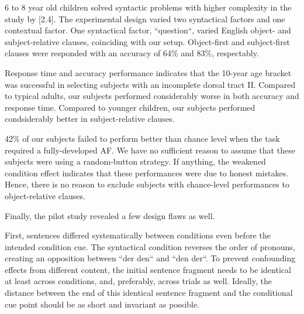 6 to 8 year old children solved syntactic problems with higher complexity in the study by [2.4].
The experimental design varied two syntactical factors and one contextual factor.
One syntactical factor, ``question``, varied English object- and subject-relative clauses, coinciding with our setup.
Object-first and subject-first clauses were responded with an accuracy of 64\% and 83\%, respectably.

Response time and accuracy performance indicates that the 10-year age bracket was successful in selecting subjects with an incomplete dorsal tract II.
Compared to typical adults, our subjects performed considerably worse in both accuracy and response time.
Compared to younger children, our subjects performed condsiderably better in subject-relative clauses.

42\% of our subjects failed to perform better than chance level when the task required a fully-developed AF.
We have no sufficient reason to assume that these subjects were using a random-button strategy.
If anything, the weakened condition effect indicates that these performances were due to honest mistakes.
Hence, there is no reason to exclude subjects with chance-level performances to object-relative clauses.


Finally, the pilot study revealed a few design flaws as well.

First, sentences differed systematically between conditions even before the intended condition cue.
The syntactical condition reverses the order of pronouns, creating an opposition between ``der den`` and ``den der``.
To prevent confounding effects from different content, the initial sentence fragment needs to be identical at least across conditions, and, preferably, across trials as well.
Ideally, the distance between the end of this identical sentence fragment and the conditional cue point should be as short and invariant as possible.

